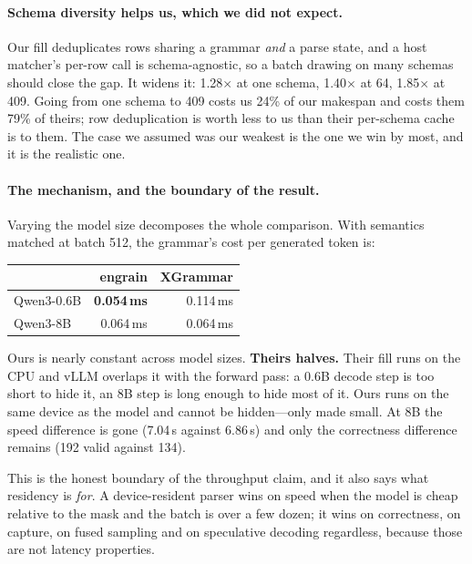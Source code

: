 \documentclass{article}
\begin{document}
\paragraph{Schema diversity helps us, which we did not expect.} Our fill
deduplicates rows sharing a grammar \emph{and} a parse state, and a host
matcher's per-row call is schema-agnostic, so a batch drawing on many schemas
should close the gap. It widens it: 1.28$\times$ at one schema, 1.40$\times$ at
64, 1.85$\times$ at 409. Going from one schema to 409 costs us 24\% of our
makespan and costs them 79\% of theirs; row deduplication is worth less to us
than their per-schema cache is to them. The case we assumed was our weakest is
the one we win by most, and it is the realistic one.

\paragraph{The mechanism, and the boundary of the result.} Varying the model
size decomposes the whole comparison. With semantics matched at batch 512, the
grammar's cost per generated token is:

\begin{center}
\begin{small}
\begin{tabular}{lrr}
\toprule
 & engrain & XGrammar \\
\midrule
Qwen3-0.6B & \textbf{0.054\,ms} & 0.114\,ms \\
Qwen3-8B & 0.064\,ms & 0.064\,ms \\
\bottomrule
\end{tabular}
\end{small}
\end{center}

Ours is nearly constant across model sizes. \textbf{Theirs halves.} Their fill
runs on the CPU and vLLM overlaps it with the forward pass: a 0.6B decode step
is too short to hide it, an 8B step is long enough to hide most of it. Ours
runs on the same device as the model and cannot be hidden---only made small. At
8B the speed difference is gone (7.04\,s against 6.86\,s) and only the
correctness difference remains (192 valid against 134).

This is the honest boundary of the throughput claim, and it also says what
residency is \emph{for}. A device-resident parser wins on speed when the model
is cheap relative to the mask and the batch is over a few dozen; it wins on
correctness, on capture, on fused sampling and on speculative decoding
regardless, because those are not latency properties.
\end{document}
